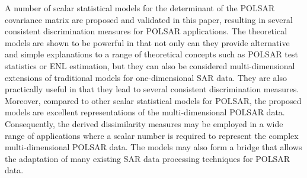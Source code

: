 \documentclass[journal]{IEEEtran}
\begin{document}
A number of scalar statistical models for the determinant of the POLSAR covariance matrix are proposed and validated in this paper,
  resulting in several consistent discrimination measures for POLSAR applications.
The theoretical models are shown to be powerful in that
  not only can they provide alternative and simple explanations to a range of theoretical concepts such as POLSAR test statistics or ENL estimation,
  but they can also be considered multi-dimensional extensions of traditional models for one-dimensional SAR data.
They are also practically useful in that they lead to several consistent discrimination measures.
Moreover, compared to other scalar statistical models for POLSAR, the proposed models are excellent representations of the multi-dimensional POLSAR data.
Consequently, the derived dissimilarity measures may be employed in a wide range of applications where a scalar number is required to represent the complex multi-dimensional POLSAR data.
The models may also form a bridge that allows the adaptation of many existing SAR data processing techniques for POLSAR data.

%
\end{document}

